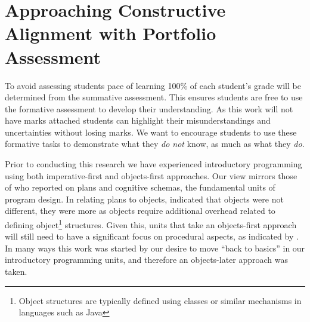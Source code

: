 
\chapter{Approaching Constructive Alignment with Portfolio Assessment} %
\label{cha:approach}

\graphicspath{{Figures/CAApproach/}}


To avoid assessing students pace of learning 100\% of each student's grade will be determined from the summative assessment. This ensures students are free to use the formative assessment to develop their understanding. As this work will not have marks attached students can highlight their misunderstandings and uncertainties without losing marks. We want to encourage students to use these formative tasks to demonstrate what they \emph{do not} know, as much as what they \emph{do}. 







\clearpage

Prior to conducting this research we have experienced introductory programming using both imperative-first and objects-first approaches. Our view mirrors those of \citet{Rist:1996} who reported on plans and cognitive schemas, the fundamental units of program design. In relating plans to objects, \citet{Rist:1996} indicated that objects were not different, they were more as objects require additional overhead related to defining object\footnote{Object structures are typically defined using classes or similar mechanisms in languages such as Java} structures. Given this, units that take an objects-first approach will still need to have a significant focus on procedural aspects, as indicated by \citet{Robins:2003}. In many ways this work was started by our desire to move ``back to basics'' \cite{Reges:2006} in our introductory programming units, and therefore an objects-later approach was taken.

